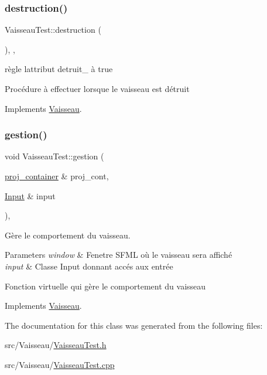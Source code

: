 \subsubsection{\texorpdfstring{destruction()}{destruction()}}
{\footnotesize\ttfamily Vaisseau\+Test\+::destruction (\begin{DoxyParamCaption}{ }\end{DoxyParamCaption})\hspace{0.3cm}{\ttfamily [inline]}, {\ttfamily [override]}, {\ttfamily [virtual]}}



règle l\textquotesingle{}attribut detruit\+\_\+ à true 

Procédure à effectuer lorsque le vaisseau est détruit 

Implements \mbox{\hyperlink{class_vaisseau_a6d7506acb12c0367989066c899ec7949}{Vaisseau}}.

\mbox{\label{class_vaisseau_test_a9207fbb193d4395cefbd6977bc502bcb}} 
\subsubsection{\texorpdfstring{gestion()}{gestion()}}
{\footnotesize\ttfamily void Vaisseau\+Test\+::gestion (\begin{DoxyParamCaption}\item[{\mbox{\hyperlink{def__type_8h_a87980cd8ee9533e561a73e8bbc728188}{proj\+\_\+container}} \&}]{proj\+\_\+cont,  }\item[{\mbox{\hyperlink{_input_8h_a5588d60d674991c719a8df848313e966}{Input}} \&}]{input }\end{DoxyParamCaption})\hspace{0.3cm}{\ttfamily [override]}, {\ttfamily [virtual]}}



Gère le comportement du vaisseau. 


\begin{DoxyParams}{Parameters}
{\em window} & Fenetre S\+F\+ML où le vaisseau sera affiché \\
\hline
{\em input} & Classe Input donnant accés aux entrée\\
\hline
\end{DoxyParams}
Fonction virtuelle qui gère le comportement du vaisseau 

Implements \mbox{\hyperlink{class_vaisseau_aece43c3acf0e125226a03209f66c5eb4}{Vaisseau}}.



The documentation for this class was generated from the following files\+:\begin{DoxyCompactItemize}
\item 
src/\+Vaisseau/\mbox{\hyperlink{_vaisseau_test_8h}{Vaisseau\+Test.\+h}}\item 
src/\+Vaisseau/\mbox{\hyperlink{_vaisseau_test_8cpp}{Vaisseau\+Test.\+cpp}}\end{DoxyCompactItemize}
